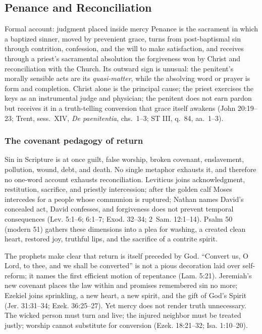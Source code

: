\subsection{Penance and Reconciliation}

\begin{massbox}{Formal account: judgment placed inside mercy}
Penance is the sacrament in which a baptized sinner, moved by prevenient grace, turns from post-baptismal sin through contrition, confession, and the will to make satisfaction, and receives through a priest's sacramental absolution the forgiveness won by Christ and reconciliation with the Church. Its outward sign is unusual: the penitent's morally sensible acts are its \emph{quasi-matter}, while the absolving word or prayer is form and completion. Christ alone is the principal cause; the priest exercises the keys as an instrumental judge and physician; the penitent does not earn pardon but receives it in a truth-telling conversion that grace itself awakens (John 20:19--23; Trent, sess.~XIV, \emph{De paenitentia}, chs.~1--3; ST III, q.~84, aa.~1--3).
\end{massbox}

\subsubsection{The covenant pedagogy of return}

Sin in Scripture is at once guilt, false worship, broken covenant, enslavement, pollution, wound, debt, and death. No single metaphor exhausts it, and therefore no one-word account exhausts reconciliation. Leviticus joins acknowledgment, restitution, sacrifice, and priestly intercession; after the golden calf Moses intercedes for a people whose communion is ruptured; Nathan names David's concealed act, David confesses, and forgiveness does not prevent temporal consequences (Lev. 5:1--6; 6:1--7; Exod. 32--34; 2~Sam. 12:1--14). Psalm 50 (modern 51) gathers these dimensions into a plea for washing, a created clean heart, restored joy, truthful lips, and the sacrifice of a contrite spirit.

The prophets make clear that return is itself preceded by God. ``Convert us, O Lord, to thee, and we shall be converted'' is not a pious decoration laid over self-reform; it names the first efficient motion of repentance (Lam. 5:21). Jeremiah's new covenant places the law within and promises remembered sin no more; Ezekiel joins sprinkling, a new heart, a new spirit, and the gift of God's Spirit (Jer. 31:31--34; Ezek. 36:25--27). Yet mercy does not render truth unnecessary. The wicked person must turn and live; the injured neighbor must be treated justly; worship cannot substitute for conversion (Ezek. 18:21--32; Isa. 1:10--20).

